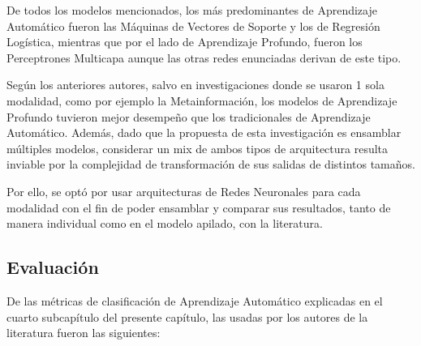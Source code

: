 De todos los modelos mencionados, los más predominantes de Aprendizaje Automático fueron las Máquinas de Vectores de Soporte y los de Regresión Logística, mientras que por el lado de Aprendizaje Profundo, fueron los Perceptrones Multicapa aunque las otras redes enunciadas derivan de este tipo.

Según los anteriores autores, salvo en investigaciones donde se usaron 1 sola modalidad, como por ejemplo la Metainformación, los modelos de Aprendizaje Profundo tuvieron mejor desempeño que los tradicionales de Aprendizaje Automático. Además, dado que la propuesta de esta investigación es ensamblar múltiples modelos, considerar un mix de ambos tipos de arquitectura resulta inviable por la complejidad de transformación de sus salidas de distintos tamaños.

Por ello, se optó por usar arquitecturas de Redes Neuronales para cada modalidad con el fin de poder ensamblar y comparar sus resultados, tanto de manera individual como en el modelo apilado, con la literatura.

\subsection{Evaluación}
De las métricas de clasificación de Aprendizaje Automático explicadas en el cuarto subcapítulo del presente capítulo, las usadas por los autores de la literatura fueron las siguientes:

